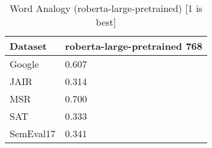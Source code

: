 \begin{table}[]
\centering
\begin{tabular}{l|l}
\hline
Dataset & roberta-large-pretrained 768 \\
\hline
Google & 0.607 \\ 
JAIR & 0.314 \\ 
MSR & 0.700 \\ 
SAT & 0.333 \\ 
SemEval17 & 0.341
\end{tabular}
\caption{Word Analogy (roberta-large-pretrained) [1 is best]}
\label{tab:analogy-roberta-large-pretrained}
\end{table}
